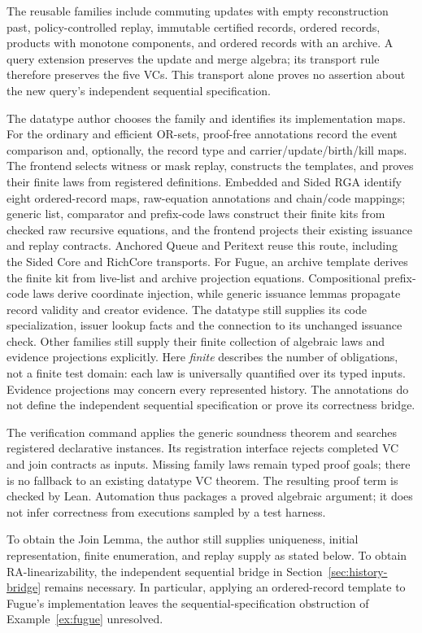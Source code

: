 The reusable families include commuting updates with empty reconstruction past,
policy-controlled replay, immutable certified records, ordered records,
products with monotone components, and ordered records with an archive.
A query extension preserves the update and merge algebra; its transport rule
therefore preserves the five VCs. This transport alone proves no assertion
about the new query's independent sequential specification.

The datatype author chooses the family and identifies its implementation maps.
For the ordinary and efficient OR-sets, proof-free annotations record the event
comparison and, optionally, the record type and carrier/update/birth/kill maps.
The frontend selects witness or mask replay, constructs the templates, and
proves their finite laws from registered definitions. Embedded and Sided RGA identify
eight ordered-record maps, raw-equation annotations and chain/code mappings;
generic list, comparator and prefix-code laws
construct their finite kits from checked raw recursive equations, and the frontend
projects their existing issuance and replay contracts. Anchored Queue and
Peritext reuse this route, including the Sided Core and RichCore transports.
For Fugue, an archive template derives the finite kit from live-list and
archive projection equations. Compositional prefix-code laws derive coordinate
injection, while generic issuance lemmas propagate record validity and creator
evidence. The datatype still supplies its code specialization, issuer lookup
facts and the connection to its unchanged issuance check. Other families still supply their finite collection
of algebraic laws and evidence projections explicitly. Here \emph{finite} describes the number of obligations,
not a finite test domain: each law is universally quantified over its typed
inputs. Evidence projections may concern every represented history. The
annotations do not define the independent sequential specification or prove
its correctness bridge.

The verification command applies the generic soundness theorem and searches
registered declarative instances. Its registration interface rejects completed
VC and join contracts as inputs. Missing family laws remain typed proof goals;
there is no fallback to an existing datatype VC theorem. The resulting proof
term is checked by Lean. Automation thus packages a proved algebraic argument;
it does not infer correctness from executions sampled by a test harness.

To obtain the Join Lemma, the author still supplies uniqueness, initial
representation, finite enumeration, and replay supply as stated below.
To obtain RA-linearizability, the independent sequential bridge in
Section~\ref{sec:history-bridge} remains necessary. In particular, applying an
ordered-record template to Fugue's implementation leaves the
sequential-specification obstruction of Example~\ref{ex:fugue} unresolved.

